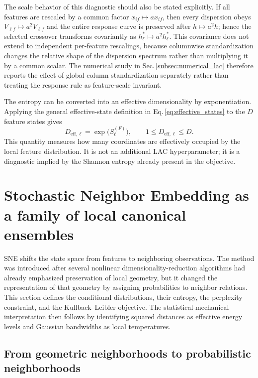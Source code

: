 \documentclass[11pt,a4paper]{article}
\theoremstyle{definition}
\theoremstyle{plain}
\begin{document}
The scale behavior of this diagnostic should also be stated explicitly. If all features are rescaled by a common factor $x_{if}\mapsto a x_{if}$, then every dispersion obeys $V_{\ell f}\mapsto a^2V_{\ell f}$ and the entire response curve is preserved after $h\mapsto a^2h$; hence the selected crossover transforms covariantly as $h_\ell^*\mapsto a^2h_\ell^*$. This covariance does not extend to independent per-feature rescalings, because columnwise standardization changes the relative shape of the dispersion spectrum rather than multiplying it by a common scalar. The numerical study in Sec.\,\ref{subsec:numerical_lac} therefore reports the effect of global column standardization separately rather than treating the response rule as feature-scale invariant.

The entropy can be converted into an effective dimensionality by exponentiation. Applying the general effective-state definition in Eq.\,\eqref{eq:effective_states} to the $D$ feature states gives
\begin{equation}
    D_{\mathrm{eff},\ell}
    =\exp\bigl(S_\ell^{(F)}\bigr),
    \qquad
    1\le D_{\mathrm{eff},\ell}\le D.
    \label{eq:effective_features}
\end{equation}
This quantity measures how many coordinates are effectively occupied by the local feature distribution. It is not an additional LAC hyperparameter; it is a diagnostic implied by the Shannon entropy already present in the objective.

\section{Stochastic Neighbor Embedding as a family of local canonical ensembles}
\label{sec:sne}

SNE shifts the state space from features to neighboring observations. The method was introduced after several nonlinear dimensionality-reduction algorithms had already emphasized preservation of local geometry, but it changed the representation of that geometry by assigning probabilities to neighbor relations. This section defines the conditional distributions, their entropy, the perplexity constraint, and the Kullback--Leibler objective. The statistical-mechanical interpretation then follows by identifying squared distances as effective energy levels and Gaussian bandwidths as local temperatures.

\subsection{From geometric neighborhoods to probabilistic neighborhoods}
\label{subsec:sne_history}
\end{document}

